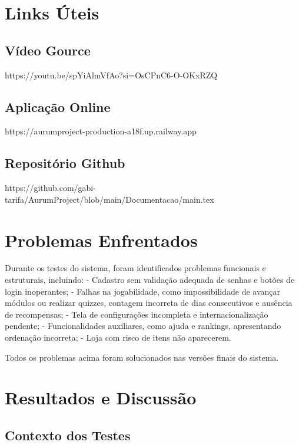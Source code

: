 \documentclass[
	article,			%
	12pt,				%
	oneside,			%
	a4paper,			%
	english,			%
	brazil,				%
	sumario=tradicional
	]{abntex2}
\begin{document}
\section{Links Úteis}
\subsection{Vídeo Gource}

https://youtu.be/spYiAlmVfAo?si=OsCPnC6-O-OKxRZQ

\subsection{Aplicação Online}

https://aurumproject-production-a18f.up.railway.app


\subsection{Repositório Github}

https://github.com/gabi-tarifa/AurumProject/blob/main/Documentacao/main.tex




\section{Problemas Enfrentados}

Durante os testes do sistema, foram identificados problemas funcionais e estruturais, incluindo:  
- Cadastro sem validação adequada de senhas e botões de login inoperantes;  
- Falhas na jogabilidade, como impossibilidade de avançar módulos ou realizar quizzes, contagem incorreta de dias consecutivos e ausência de recompensas;  
- Tela de configurações incompleta e internacionalização pendente;  
- Funcionalidades auxiliares, como ajuda e rankings, apresentando ordenação incorreta;  
- Loja com risco de itens não aparecerem.  

Todos os problemas acima foram solucionados nas versões finais do sistema.

\section{Resultados e Discussão}

\subsection{Contexto dos Testes}
\end{document}
